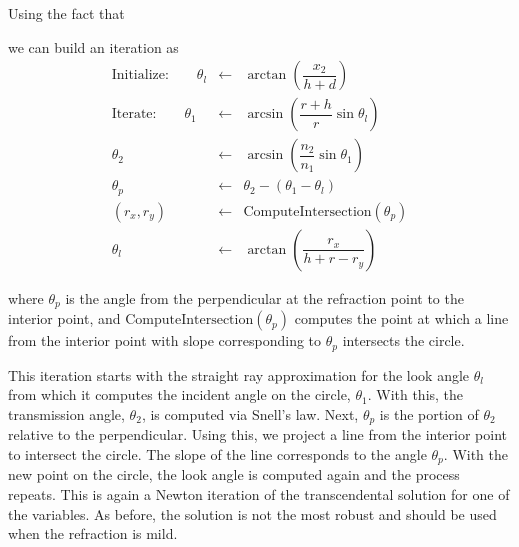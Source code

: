 Using the fact that 

we can build an iteration as
\begin{eqnarray}
\textrm{Initialize:} \quad \quad \theta_l &\leftarrow &\arctan\left( \dfrac{x_2}{h + d}\right) \ \nonumber \\
\textrm{Iterate:} \quad \quad\theta_1 &\leftarrow &\arcsin\left( \dfrac{r + h}{r}\sin\theta_l \right) \nonumber  \\
\theta_2  &\leftarrow & \arcsin\left( \dfrac{n_2}{n_1} \sin\theta_1 \right) \\
\theta_p  &\leftarrow & \theta_2 - (\theta_1 - \theta_l) \\
(r_x, r_y) &\leftarrow & \textrm{ComputeIntersection}(\theta_p) \\
\theta_l  &\leftarrow &  \arctan\left( \dfrac{r_x}{h + r  - r_y}\right) \nonumber
\end{eqnarray}

\noindent where $\theta_p$ is the angle from the perpendicular at the refraction point to the interior point, and $\textrm{ComputeIntersection}(\theta_p)$ computes the point at which a line from the interior point with slope corresponding to $\theta_p$ intersects the circle.  

This iteration starts with the straight ray approximation for the look angle $\theta_l$ from which it computes the incident angle on the circle, $\theta_1$. With this, the transmission angle, $\theta_2$, is computed via Snell's law. Next, $\theta_p$ is the portion of $\theta_2$ relative to the perpendicular.  Using this, we project a line from the interior point to intersect the circle. The slope of the line corresponds to the angle $\theta_p$. With the new point on the circle, the look angle is computed again and the process repeats.  This is again a Newton iteration of the transcendental solution for one of the variables. As before, the solution is not the most robust and should be used when the refraction is mild.


